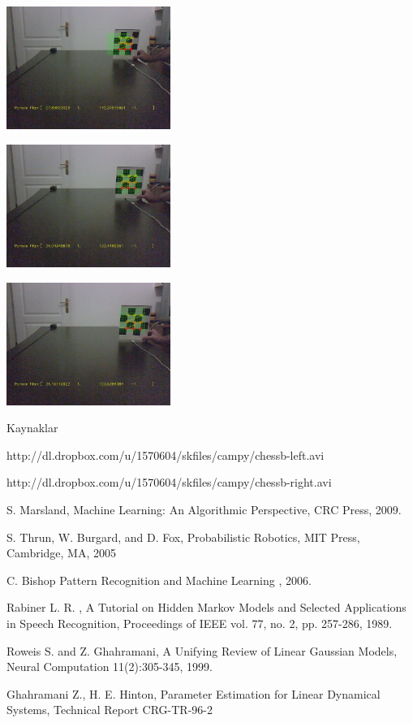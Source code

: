 \documentclass[12pt,fleqn]{article}
\begin{document}
\includegraphics[height=4cm]{cb-pf-2.jpg}

\includegraphics[height=4cm]{cb-pf-3.jpg}

\includegraphics[height=4cm]{cb-pf-4.jpg}

Kaynaklar

http://dl.dropbox.com/u/1570604/skfiles/campy/chessb-left.avi

http://dl.dropbox.com/u/1570604/skfiles/campy/chessb-right.avi

S. Marsland, Machine Learning: An Algorithmic Perspective, CRC Press,
2009.

S. Thrun, W. Burgard, and D. Fox, Probabilistic Robotics, MIT Press,
Cambridge, MA, 2005

C. Bishop Pattern Recognition and Machine Learning , 2006.

Rabiner L. R. , A Tutorial on Hidden Markov Models and Selected
Applications in Speech Recognition, Proceedings of IEEE vol. 77, no. 2,
pp. 257-286, 1989.

Roweis S. and Z. Ghahramani, A Unifying Review of Linear Gaussian Models,
Neural Computation 11(2):305-345, 1999.

Ghahramani Z., H. E. Hinton, Parameter Estimation for Linear Dynamical
Systems, Technical Report CRG-TR-96-2
\end{document}
